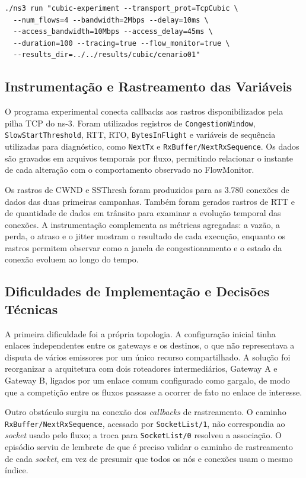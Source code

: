 \documentclass[a4paper,12pt]{monografia}
\begin{document}
\begin{verbatim}
./ns3 run "cubic-experiment --transport_prot=TcpCubic \
  --num_flows=4 --bandwidth=2Mbps --delay=10ms \
  --access_bandwidth=10Mbps --access_delay=45ms \
  --duration=100 --tracing=true --flow_monitor=true \
  --results_dir=../../results/cubic/cenario01"
\end{verbatim}

\subsection{Instrumentação e Rastreamento das Variáveis}

O programa experimental conecta callbacks aos rastros disponibilizados pela pilha TCP do ns-3. Foram utilizados registros de \texttt{CongestionWindow}, \texttt{SlowStartThreshold}, RTT, RTO, \texttt{BytesInFlight} e variáveis de sequência utilizadas para diagnóstico, como \texttt{NextTx} e \texttt{RxBuffer/NextRxSequence}. Os dados são gravados em arquivos temporais por fluxo, permitindo relacionar o instante de cada alteração com o comportamento observado no FlowMonitor.

Os rastros de CWND e SSThresh foram produzidos para as 3.780 conexões de dados das duas primeiras campanhas. Também foram gerados rastros de RTT e de quantidade de dados em trânsito para examinar a evolução temporal das conexões. A instrumentação complementa as métricas agregadas: a vazão, a perda, o atraso e o jitter mostram o resultado de cada execução, enquanto os rastros permitem observar como a janela de congestionamento e o estado da conexão evoluem ao longo do tempo.

\subsection{Dificuldades de Implementação e Decisões Técnicas}

A primeira dificuldade foi a própria topologia. A configuração inicial tinha enlaces independentes entre os gateways e os destinos, o que não representava a disputa de vários emissores por um único recurso compartilhado. A solução foi reorganizar a arquitetura com dois roteadores intermediários, Gateway A e Gateway B, ligados por um enlace comum configurado como gargalo, de modo que a competição entre os fluxos passasse a ocorrer de fato no enlace de interesse.

Outro obstáculo surgiu na conexão dos \textit{callbacks} de rastreamento. O caminho \texttt{RxBuffer/NextRxSequence}, acessado por \texttt{SocketList/1}, não correspondia ao \textit{socket} usado pelo fluxo; a troca para \texttt{SocketList/0} resolveu a associação. O episódio serviu de lembrete de que é preciso validar o caminho de rastreamento de cada \textit{socket}, em vez de presumir que todos os nós e conexões usam o mesmo índice.
\end{document}
